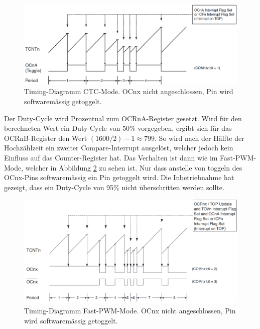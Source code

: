 \begin{figure}[H]
	\centering
	\includegraphics[width=\textwidth]{graphics/Timer_CTC_Timing_Diagram}
	\caption{Timing-Diagramm CTC-Mode. OCnx nicht angeschlossen, Pin wird softwaremässig getoggelt.\cite[S.146]{atmel_atmel_2014}}
	\label{fig:Timer_CTC_Timing_Diagram}
\end{figure}

Der Duty-Cycle wird Prozentual zum OCRnA-Register gesetzt. Wird für den berechneten Wert ein Duty-Cycle von 50\% vorgegeben, ergibt sich für das OCRnB-Register den Wert $(1600 / 2) -1 \approx 799$. So wird nach der Hälfte der Hochzählzeit ein zweiter Compare-Interrupt ausgelöst, welcher jedoch kein Einfluss auf das Counter-Register hat. Das Verhalten ist dann wie im Fast-PWM-Mode, welcher in Abbildung \ref{fig:Timer_Fast_PWM_Timing_Diagram} zu sehen ist. Nur dass anstelle von toggeln des OCnx-Pins softwaremässig ein Pin getoggelt wird. Die Inbetriebnahme hat gezeigt, dass ein Duty-Cycle von 95\% nicht überschritten werden sollte.

\begin{figure}[H]
	\centering
	\includegraphics[width=\textwidth]{graphics/Timer_Fast_PWM_Timing_Diagram}
	\caption{Timing-Diagramm Fast-PWM-Mode. OCnx nicht angeschlossen, Pin wird softwaremässig getoggelt.\cite[S.147]{atmel_atmel_2014}}
	\label{fig:Timer_Fast_PWM_Timing_Diagram}
\end{figure}

